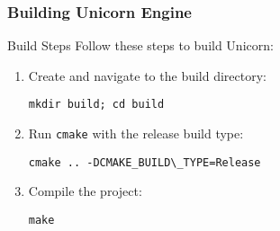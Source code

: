 \begin{frame}[fragile]
\frametitle{Building Unicorn Engine}

\begin{block}{Build Steps}
    Follow these steps to build Unicorn:
    \begin{enumerate}
        \item Create and navigate to the build directory:
        \begin{verbatim}
mkdir build; cd build
        \end{verbatim}
        \item Run \texttt{cmake} with the release build type:
        \begin{verbatim}
cmake .. -DCMAKE_BUILD\_TYPE=Release
        \end{verbatim}
        \item Compile the project:
        \begin{verbatim}
make
        \end{verbatim}
    \end{enumerate}
\end{block}
\end{frame}
